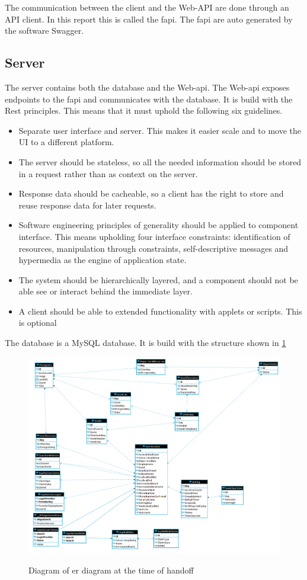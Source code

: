 The communication between the client and the Web-API are done through an API client. In this report this is called the \gls{fapi}. The \gls{fapi} are auto generated by the software Swagger.

\subsection{Server}
The server contains both the database and the Web-api. The Web-api exposes endpoints to the \gls{fapi} and communicates with the database. It is build with the Rest principles. This means that it must uphold the following six guidelines\cite{REST}. 
\begin{itemize}
    \item Separate user interface and server. This makes it easier scale and to move the UI to a different platform.
    \item The server should be stateless, so all the needed information should be stored in a request rather than as context on the server.
    \item Response data should be cacheable, so a client has the right to store and reuse response data for later requests. 
    \item Software engineering principles of generality should be applied to component interface. This means upholding four interface constraints: identification of resources, manipulation through constraints, self-descriptive messages and hypermedia as the engine of application state. 
    \item The system should be hierarchically layered, and a component should not be able see or interact behind the immediate layer.
    \item A client should be able to extended functionality with applets or scripts. This is optional
\end{itemize}

The database is a MySQL database. It is build with the structure shown in \ref{fig:state-at-handoff:db}

\begin{figure}[ht]
    \centering
    \caption{Diagram of \gls{er} diagram at the time of handoff}
    \includegraphics[width=1\textwidth]{figures/db_ho.png}
    \label{fig:state-at-handoff:db}
\end{figure}

